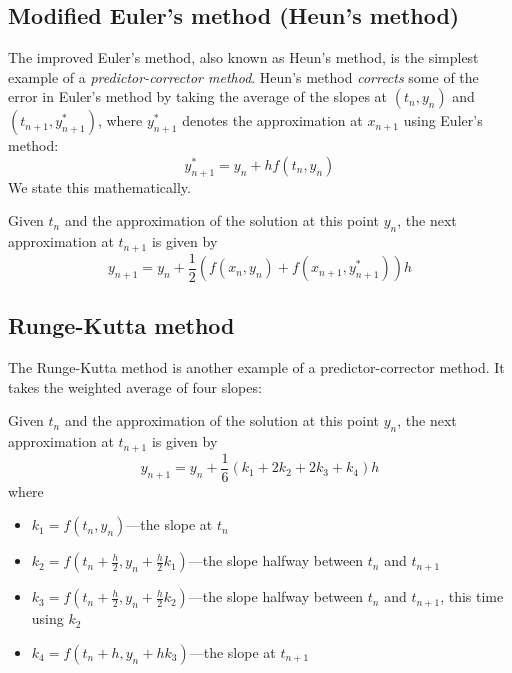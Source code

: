 \subsection{Modified Euler's method (Heun's method)}
The improved Euler's method, also known as Heun's method, is the simplest example of a \textit{predictor-corrector method}. Heun's method \textit{corrects} some of the error in Euler's method by taking the average of the slopes at $(t_n, y_n)$ and $(t_{n + 1}, y_{n + 1}^*)$, where $y_{n + 1}^*$ denotes the approximation at $x_{n + 1}$ using Euler's method:
\[
  y_{n + 1}^* = y_n + hf(t_n, y_n)
\]
We state this mathematically.
\begin{definition}
  Given $t_n$ and the approximation of the solution at this point $y_n$, the next approximation at $t_{n + 1}$ is given by
  \[
    y_{n + 1} = y_n + \frac{1}{2} (f(x_n, y_n) + f(x_{n + 1}, y_{n + 1}^*))h
  \]
\end{definition}


\subsection{Runge-Kutta method}
The Runge-Kutta method is another example of a predictor-corrector method. It takes the weighted average of four slopes:
\begin{definition}
  Given $t_n$ and the approximation of the solution at this point $y_n$, the next approximation at $t_{n + 1}$ is given by
  \[
    y_{n + 1} = y_n + \frac{1}{6}(k_1 + 2k_2 + 2k_3 + k_4) h
  \]
  where
  \begin{itemize}
    \item $k_1 = f(t_n, y_n)$---the slope at $t_n$
    \item $k_2 = f(t_n + \frac{h}{2}, y_n + \frac{h}{2} k_1)$---the slope halfway between $t_n$ and $t_{n + 1}$
    \item $k_3 = f(t_n + \frac{h}{2}, y_n + \frac{h}{2} k_2)$---the slope halfway between $t_n$ and $t_{n + 1}$, this time using $k_2$
    \item $k_4 = f(t_n + h, y_n + hk_3)$---the slope at $t_{n + 1}$
  \end{itemize}
\end{definition}